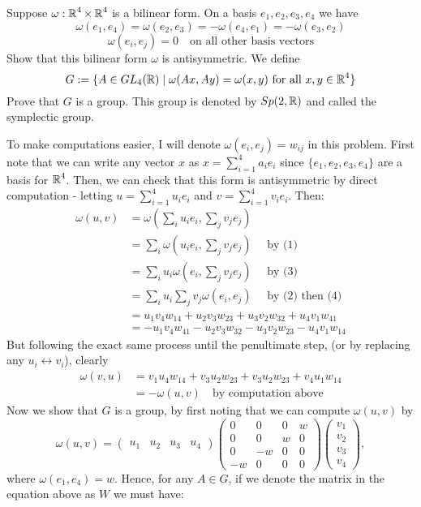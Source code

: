\documentclass[11pt,onecolumn]{article}
\begin{document}
\begin{exercise}
Suppose $\omega : \operatorname{\mathbb{R}}^4 \times \operatorname{\mathbb{R}}^4$ is a bilinear form. On a basis $e_1, e_2, e_3, e_4$ we have
$$\omega(e_1, e_4) = \omega(e_2, e_3) = -\omega(e_4, e_1) = -\omega(e_3, e_2)$$
$$\omega(e_i, e_j ) = 0 \quad  \text{on all other basis vectors} $$
Show that this bilinear form $\omega$ is antisymmetric. We define
$$G := \{A \in GL_4(\operatorname{\mathbb{R}}) \mid \omega(Ax, Ay) = \omega(x, y) \text{ for all } x, y \in \operatorname{\mathbb{R}}^4\}$$
Prove that $G$ is a group. This group is denoted by $Sp(2, \operatorname{\mathbb{R}})$ and called the symplectic group.
\end{exercise}
\begin{answer}
To make computations easier, I will denote $\omega(e_i,e_j) = w_{ij}$ in this problem. First note that we can write any vector $x$ as $x = \sum_{i=1}^4 a_i e_i$ since $\{e_1,e_2,e_3,e_4\}$ are a basis for $\operatorname{\mathbb{R}}^4$. Then, we can check that this form is antisymmetric by direct computation - letting $u = \sum_{i=1}^4 u_i e_i$ and $v = \sum_{i=1}^4 v_i e_i$. Then:
\begin{align*}
    \omega(u,v) &= \omega( \sum_i u_i e_i,\sum_j v_j e_j ) \\
    &= \sum_i \omega(u_ie_i,\sum_j v_je_j) \quad \text{ by (1)} \\
    &= \sum_i u_i\omega(e_i,\sum_j v_je_j) \quad \text{ by (3)} \\
    &= \sum_i u_i \sum_j v_j\omega(e_i, e_j) \quad \text{ by (2) then (4)} \\
    &= u_1v_4 w_{14} + u_2v_3 w_{23} + u_3v_2w_{32} + u_4v_1w_{41} \\
    &= -u_1v_4w_{41} - u_2v_3w_{32} - u_3v_2w_{23} - u_4v_1w_{14}
\end{align*}
But following the exact same process until the penultimate step, (or by replacing any $u_i \leftrightarrow v_i$), clearly 
\begin{align*}
    \omega(v,u) &= v_1u_4w_{14} + v_3u_2w_{23} + v_3u_2w_{23} + v_4u_1w_{14} \\
    &= - \omega(u,v) \quad \text{by computation above}
\end{align*}
Now we show that $G$ is a group, by first noting that we can compute $\omega(u,v)$ by
$$ \omega(u,v) = \begin{pmatrix} u_1 & u_2 & u_3 & u_4 \end{pmatrix} \begin{pmatrix} 0 & 0 & 0 & w \\ 0 & 0 & w & 0 \\ 0 & -w & 0 & 0 \\ -w & 0 & 0 & 0\end{pmatrix} \begin{pmatrix} v_1 \\ v_2 \\ v_3 \\ v_4 \end{pmatrix}, $$ where $\omega(e_1,e_4) = w$. Hence, for any $A \in G$, if we denote the matrix in the equation above as $W$ we must have:

\end{answer}
\end{document}

